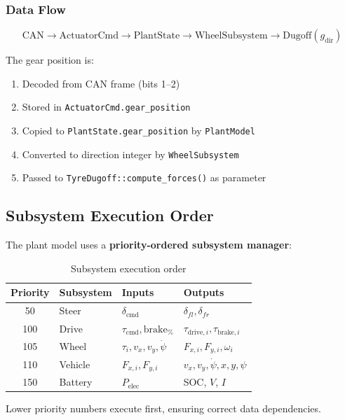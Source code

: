 \documentclass[11pt,a4paper]{article}
\begin{document}
\subsubsection{Data Flow}

\begin{equation}
\text{CAN} \to \text{ActuatorCmd} \to \text{PlantState} \to \text{WheelSubsystem} \to \text{Dugoff}(g_{\text{dir}})
\end{equation}

The gear position is:
\begin{enumerate}
    \item Decoded from CAN frame (bits 1--2)
    \item Stored in \texttt{ActuatorCmd.gear\_position}
    \item Copied to \texttt{PlantState.gear\_position} by \texttt{PlantModel}
    \item Converted to direction integer by \texttt{WheelSubsystem}
    \item Passed to \texttt{TyreDugoff::compute\_forces()} as parameter
\end{enumerate}

\subsection{Subsystem Execution Order}

The plant model uses a \textbf{priority-ordered subsystem manager}:

\begin{table}[H]
\centering
\begin{tabular}{clll}
\toprule
\textbf{Priority} & \textbf{Subsystem} & \textbf{Inputs} & \textbf{Outputs} \\
\midrule
50  & Steer & $\delta_{\text{cmd}}$ & $\delta_{fl}, \delta_{fr}$ \\
100 & Drive & $\tau_{\text{cmd}}, \text{brake}_{\%}$ & $\tau_{\text{drive},i}, \tau_{\text{brake},i}$ \\
105 & Wheel & $\tau_{i}, v_x, v_y, \dot{\psi}$ & $F_{x,i}, F_{y,i}, \omega_i$ \\
110 & Vehicle & $F_{x,i}, F_{y,i}$ & $v_x, v_y, \dot{\psi}, x, y, \psi$ \\
150 & Battery & $P_{\text{elec}}$ & SOC, $V$, $I$ \\
\bottomrule
\end{tabular}
\caption{Subsystem execution order}
\end{table}

Lower priority numbers execute first, ensuring correct data dependencies.
\end{document}
